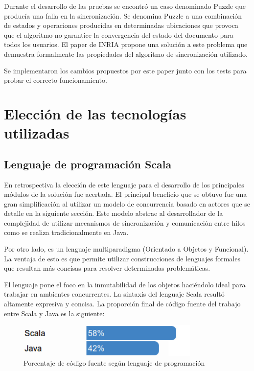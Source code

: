 \documentclass[12pt,a4paper]{article}
\let\stdsection\section
\renewcommand\section{\newpage\stdsection}
\begin{document}
Durante el desarrollo de las pruebas se encontró un caso denominado Puzzle \cite{inria} que producía una falla en la
sincronización. Se denomina Puzzle a una combinación de estados y operaciones producidas en determinadas
ubicaciones que provoca que el algoritmo no garantice la convergencia del estado del documento para todos 
los usuarios. El paper de INRIA \cite{inria} propone una solución a este problema que demuestra formalmente las 
propiedades del algoritmo de sincronización utilizado.

Se implementaron los cambios propuestos por este paper junto con los tests para probar el correcto funcionamiento.

\section{Elección de las tecnologías utilizadas}

\subsection{Lenguaje de programación Scala}
En retrospectiva la elección de este lenguaje para el desarrollo de los principales módulos de la solución fue
acertada. El principal beneficio que se obtuvo fue una gran simplificación al utilizar un modelo de concurrencia
basado en actores \cite{actors1,actors2} que se detalle en la siguiente sección.
Este modelo abstrae al desarrollador de la complejidad de utilizar mecanismos de sincronización y 
comunicación entre hilos como se realiza tradicionalmente en Java.

Por otro lado, es un lenguaje multiparadigma (Orientado a Objetos y Funcional). La ventaja de esto es que permite 
utilizar construcciones de lenguajes formales que resultan más concisas para resolver determinadas problemáticas.

El lenguaje pone el foco en la inmutabilidad de los objetos haciéndolo ideal para trabajar en ambientes concurrentes.
La sintaxis del lenguaje Scala resultó altamente expresiva y concisa. La proporción final de código fuente del trabajo
entre Scala y Java es la siguiente:

	\begin{figure}[!ht]
		\begin{center}
			\includegraphics[width=9cm]{porcentaje.png}
			\caption{\label{porcentaje} Porcentaje de código fuente según lenguaje de programación }
		\end{center}
	\end{figure}
\end{document}
